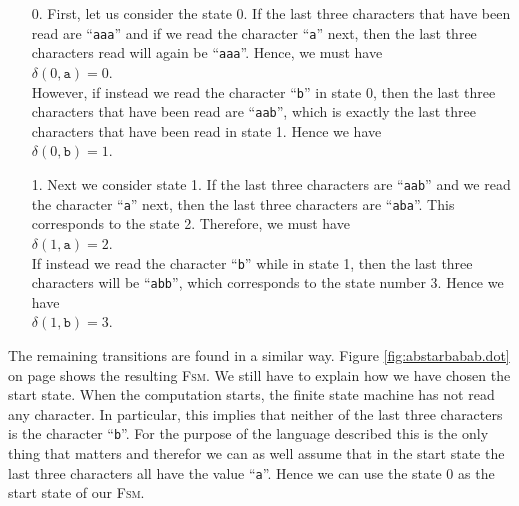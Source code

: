 \begin{enumerate}
\item[0.] First, let us consider the state 0.  If the last three characters that have been read are
          ``\texttt{aaa}'' and if we read the character ``\texttt{a}'' next, then the last three
          characters read will again be ``\texttt{aaa}''.  Hence, we must have
          \\[0.2cm]
          \hspace*{1.3cm}
          $\delta(0, \mathtt{a}) = 0$.
          \\[0.2cm]
          However, if instead we read the character ``\texttt{b}'' in state 0, then the last three
          characters that have been read are ``\texttt{aab}'', which is exactly the last three
          characters that have been read in state 1.  Hence we have
          \\[0.2cm]
          \hspace*{1.3cm}
          $\delta(0, \mathtt{b}) = 1$.
\item[1.] Next we consider state 1.  If the last three characters are ``\texttt{aab}'' and we read
          the character ``\texttt{a}'' next, then the last three characters are ``\texttt{aba}''.
          This corresponds to the state  2.  Therefore, we must have
          \\[0.2cm]
          \hspace*{1.3cm}
          $\delta(1, \mathtt{a}) = 2$.
          \\[0.2cm]
          If instead we read the character  ``\texttt{b}'' while in state 1, then the last three
          characters will be ``\texttt{abb}'', which corresponds to the state number  3.  Hence we have
          \\[0.2cm]
          \hspace*{1.3cm}
          $\delta(1, \mathtt{b}) = 3$.
\end{enumerate}
The remaining transitions are found in a similar way.
Figure \ref{fig:abstarbabab.dot} on page \pageref{fig:abstarbabab.dot} shows the resulting \textsc{Fsm}.
We still have to explain how we have chosen the start state.  When the computation starts, the
finite state machine has not read any character.  In particular, this implies that neither of the
last three characters is the character ``\texttt{b}''.  For the purpose of the language described
this is the only thing that matters and therefor we can as well assume that in the start state the
last three characters all have the value ``\texttt{a}''.  Hence we can use the state 0 as the start
state of our \textsc{Fsm}.

